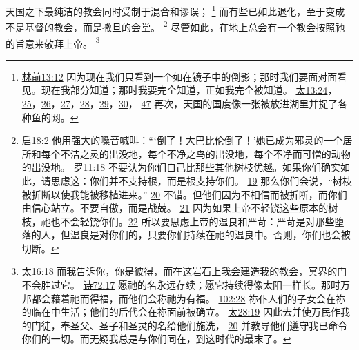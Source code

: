 \documentclass[12pt, a4paper, oneside]{ctexart}
\newcounter{parnum}[section]
\newcommand{\N}{%
   \noindent\refstepcounter{parnum}%
    \makebox[\parindent][l]{\textbf{\arabic{parnum}.}}}
\begin{document}
\N 天国之下最纯洁的教会同时受制于混合和谬误；
	\footnote {
		\href{https://biblehub.com/1_corinthians/13-12.htm}{林前13:12} 因为现在我们只看到一个如在镜子中的倒影；那时我们要面对面看见。现在我部分知道；那时我要完全知道，正如我完全被知道。
		\href{https://biblehub.com/matthew/13-24.htm}{太13:24}，\href{https://biblehub.com/matthew/13-25.htm}{25}，\href{https://biblehub.com/matthew/13-26.htm}{26}，\href{https://biblehub.com/matthew/13-27.htm}{27}，\href{https://biblehub.com/matthew/13-28.htm}{28}，\href{https://biblehub.com/matthew/13-29.htm}{29}，\href{https://biblehub.com/matthew/13-30.htm}{30}，
		\href{https://biblehub.com/matthew/13-47.htm}{47} 再次，天国的国度像一张被放进湖里并捉了各种鱼的网。
	}
	而有些已如此退化，至于变成不是基督的教会，而是撒旦的会堂。
	\footnote {
		\href{https://biblehub.com/revelation/18-2.htm}{启18:2} 他用强大的嗓音喊叫：“‘倒了！大巴比伦倒了！’她已成为邪灵的一个居所和每个不洁之灵的出没地，每个不净之鸟的出没地，每个不净而可憎的动物的出没地。
		\href{https://biblehub.com/romans/11-18.htm}{罗11:18} 不要认为你们自己比那些其他树枝优越。如果你们确实如此，请思虑这：你们并不支持根，而是根支持你们。
		\href{https://biblehub.com/romans/11-19.htm}{19} 那么你们会说，“树枝被折断以使我能被移植进来。”
		\href{https://biblehub.com/romans/11-20.htm}{20} 不错。但他们因为不相信而被折断，而你们由信心站立。不要自傲，而是战兢。
		\href{https://biblehub.com/romans/11-21.htm}{21} 因为如果上帝不轻饶这些原本的树枝，祂也不会轻饶你们。\href{https://biblehub.com/romans/11-22.htm}{22} 所以要思虑上帝的温良和严苛：严苛是对那些堕落的人，但温良是对你们的，只要你们持续在祂的温良中。否则，你们也会被切断。
	}
	尽管如此，在地上总会有一个教会按照祂的旨意来敬拜上帝。
	\footnote {
		\href{https://biblehub.com/matthew/16-18.htm}{太16:18} 而我告诉你，你是彼得，而在这岩石上我会建造我的教会，冥界的门不会胜过它。
		\href{https://biblehub.com/psalms/72-17.htm}{诗72:17} 愿祂的名永远存续；愿它持续得像太阳一样长。那时万邦都会藉着祂而得福，而他们会称祂为有福。
		\href{https://biblehub.com/psalms/102-28.htm}{102:28} 祢仆人们的子女会在祢的临在中生活；他们的后代会在祢面前被确立。
		\href{https://biblehub.com/matthew/28-19.htm}{太28:19} 因此去并使万民作我的门徒，奉圣父、圣子和圣灵的名给他们施洗，
		\href{https://biblehub.com/matthew/28-20.htm}{20} 并教导他们遵守我已命令你们的一切。而无疑我总是与你们同在，到这时代的最末了。
	}
\end{document}

